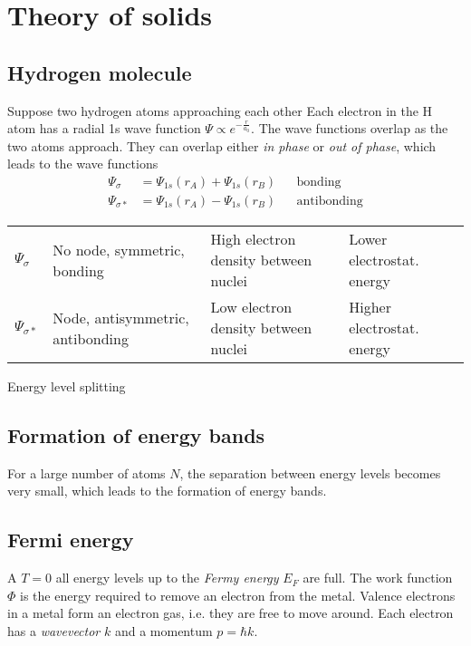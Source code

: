 \section{Theory of solids}

\subsection{Hydrogen molecule}
Suppose two hydrogen atoms approaching each other
Each electron in the H atom has a radial 1s wave function $\varPsi \propto e^{-\frac{r}{a_0}}$.
The wave functions overlap as the two atoms approach.
They can overlap either \emph{in phase} or \emph{out of phase}, which leads to the wave functions
\begin{align}
    \varPsi_{\sigma} &= \varPsi_{1s}(r_A) + \varPsi_{1s}(r_B) && \text{bonding} \\
    \varPsi_{\sigma *} &= \varPsi_{1s}(r_A) - \varPsi_{1s}(r_B) && \text{antibonding}
\end{align}

\begin{table}[htbp]
    \centering
    \begin{tabularx}{0.8\linewidth}{lXXX}
    $\varPsi_{\sigma}$ & No node, symmetric, bonding & High electron density between nuclei & Lower electrostat. energy \\
    $\varPsi_{\sigma *}$ & Node, antisymmetric, antibonding & Low electron density between nuclei & Higher electrostat. energy \\ 
    \end{tabularx}
\end{table}


Energy level splitting

\subsection{Formation of energy bands}
For a large number of atoms $N$, the separation between energy levels becomes very small, which leads to the formation of energy bands.

\subsection{Fermi energy}
A $T=0$ all energy levels up to the \emph{Fermy energy} $E_F$ are full. 
The work function $\Phi$ is the energy required to remove an electron from the metal. 
Valence electrons in a metal form an electron gas, i.e. they are free to move around. 
Each electron has a \emph{wavevector} $k$ and a momentum $p = \hbar k$.

